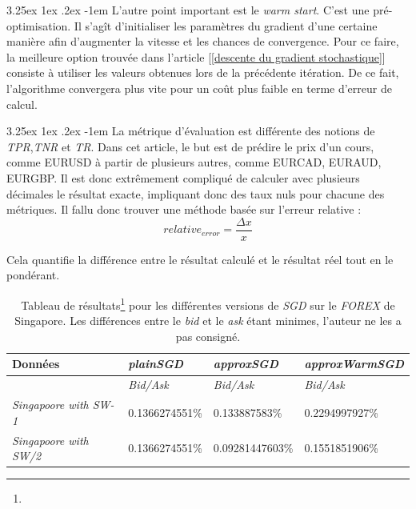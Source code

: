 \documentclass[a4paper, 11pt]{article}
\makeatletter
\newcounter{subsubsubsection}[subsubsection]
\renewcommand\paragraph{\@startsection{paragraph}{5}{\z@}%
  {3.25ex \@plus1ex \@minus.2ex}%
  {-1em}%
  {\normalfont\normalsize\bfseries}}
\makeatother
\begin{document}

\paragraph{}
L'autre point important est le \textit{warm start}. C'est une pré-optimisation. Il s'agît d'initialiser les paramètres du gradient d'une certaine manière afin d'augmenter la vitesse et les chances de convergence. Pour ce faire, la meilleure option trouvée dans l'article [\ref{descente du gradient stochastique}] consiste à utiliser les valeurs obtenues lors de la précédente itération.
De ce fait, l'algorithme convergera plus vite pour un coût plus faible en terme d'erreur de calcul.

\paragraph{}
La métrique d'évaluation est différente des notions de \textit{TPR},\textit{TNR} et \textit{TR}. Dans cet article, le but est de prédire le prix d'un cours, comme EURUSD à partir de plusieurs autres, comme EURCAD, EURAUD, EURGBP. Il est donc extrêmement compliqué de calculer avec plusieurs décimales le résultat exacte, impliquant donc des taux nuls pour chacune des métriques.
Il fallu donc trouver une méthode basée sur l'erreur relative :
$$relative_{error} = \frac{\Delta x}{x}$$

Cela quantifie la différence entre le résultat calculé et le résultat réel tout en le pondérant.


\begin{table}[H]
	\centering
\begin{tabular}{|l|l|l|l|}
	\hline
	Données & \textit{plainSGD} & \textit{approxSGD} & \textit{approxWarmSGD}\\
	\hline
	\ & \textit{Bid/Ask} & \textit{Bid/Ask} & \textit{Bid/Ask} \\
	\hline
	\textit{Singapoore with SW-1\footnotemark{}} & 0.1366274551\% & 0.133887583\% & 0.2294997927\% \\
	\hline
	\textit{Singapoore with SW/2\footnotemark{}} & 0.1366274551\% & 0.09281447603\% & 0.1551851906\%\\
	\hline

\end{tabular}
\caption[]{Tableau de résultats\footnote[3]{} pour les différentes versions de \textit{SGD} sur le \textit{FOREX} de Singapore. Les différences entre le \textit{bid} et le \textit{ask} étant minimes, l'auteur ne les a pas consigné.}
\end{table}
\end{document}
